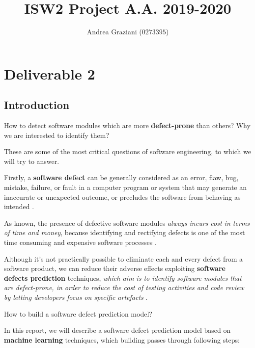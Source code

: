\documentclass[sigconf]{acmart}
\begin{document}
\title{ISW2 Project A.A. 2019-2020}

\author{Andrea Graziani ($0273395$)}

\maketitle

\section{Deliverable 2}

\subsection{Introduction}

How to detect software modules which are more \textbf{defect-prone} than others? Why we are interested to identify them? 

These are some of the most critical questions of software engineering, to which we will try to answer. 

Firstly, a \textbf{software defect} can be generally considered as an error, flaw, bug, mistake, failure, or fault in a computer program or system that may generate an inaccurate or unexpected outcome, or precludes the software from behaving as intended \cite{SoftwareDefectPredictionRawat}.

As known, the presence of defective software modules \textit{always incurs cost in terms of time and money}, because identifying and rectifying defects is one of the most time consuming and expensive software processes \cite{SoftwareDefectPredictionRawat}.

Although it's not practically possible to eliminate each and every defect from a software product, we can reduce their adverse effects exploiting \textbf{software defects prediction} techniques, \textit{which aim is to identify software modules that are defect-prone, in order to reduce the cost of testing activities and code review by letting developers focus on specific artefacts} \citep{Falessi}.

How to build a software defect prediction model? 

In this report, we will describe a software defect prediction model based on \textbf{machine learning} techniques, which building passes through following steps:
\end{document}
